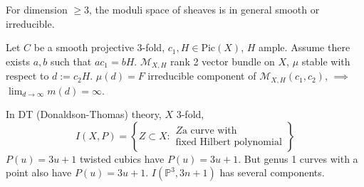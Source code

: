For dimension $\geq 3$, the moduli space of
sheaves is in general smooth or
irreducible.

\begin{theorem}[Ein]
\label{theorem-Ein}
Let $C$ be a smooth projective 3-fold, $c_1,H
\in \text{Pic}(X)$, $H$ ample.
Assume there exists $a,b$ such that
$ac_1=bH$. $\mathcal{M}_{X,H}$ rank 2 vector
bundle on $X$, $\mu$ stable with respect to
$d:=c_2H$. $\mu(d)=F$ irreducible
component of $\mathcal{M}_{X,H}(c_1,c_2)$,
$\implies $
$\lim_{d \to \infty} m(d)=\infty$.
\end{theorem}

\begin{example}
\label{example-}
In DT (Donaldson-Thomas) theory, $X$ 3-fold,
$$
I(X,P)=\left\{Z \subset X: \substack{Z \text{
a curve with} \\
\text{fixed Hilbert polynomial}}\right\}
$$
$P(u)=3u+1$ twisted cubics have  $P(u)=3u+1$.
But genus 1 curves with a
point also have  $P(u)=3u+1$.
$I(\mathbb{P}^3,3n+1)$ has several
components.
\end{example}





